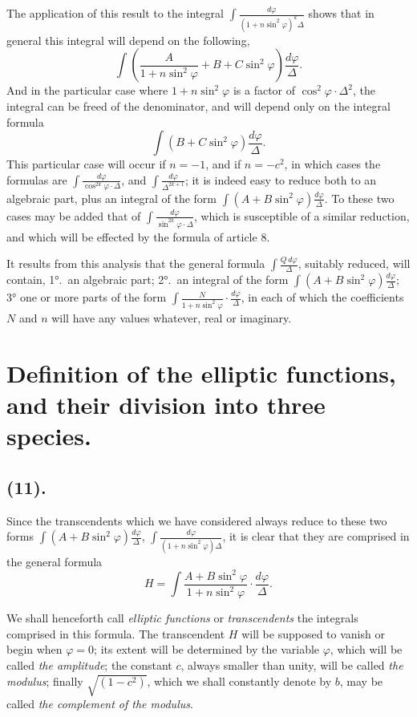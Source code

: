 \documentclass{article}
\begin{document}
The application of this result to the integral $\displaystyle\int\frac{d\varphi}{(1+n\sin^{2}\varphi)^{k}\Delta}$ shows that in general this integral will depend on the following,
\[ \int\left(\frac{A}{1+n\sin^{2}\varphi}+B+C\sin^{2}\varphi\right)\frac{d\varphi}{\Delta}. \]
And in the particular case where $1+n\sin^{2}\varphi$ is a factor of $\cos^{2}\varphi\cdot\Delta^{2}$, the integral can be freed of the denominator, and will depend only on the integral formula
\[ \int(B+C\sin^{2}\varphi)\frac{d\varphi}{\Delta}. \]
This particular case will occur if $n=-1$, and if $n=-c^{2}$, in which cases the formulas are $\displaystyle\int\frac{d\varphi}{\cos^{2k}\varphi\cdot\Delta}$, and $\displaystyle\int\frac{d\varphi}{\Delta^{2k+1}}$; it is indeed easy to reduce both to an algebraic part, plus an integral of the form $\displaystyle\int(A+B\sin^{2}\varphi)\frac{d\varphi}{\Delta}$. To these two cases may be added that of $\displaystyle\int\frac{d\varphi}{\sin^{2k}\varphi\cdot\Delta}$, which is susceptible of a similar reduction, and which will be effected by the formula of article 8.

It results from this analysis that the general formula $\displaystyle\int\frac{Q\,d\varphi}{\Delta}$, suitably reduced, will contain, 1°.\ an algebraic part; 2°.\ an integral of the form $\displaystyle\int(A+B\sin^{2}\varphi)\frac{d\varphi}{\Delta}$; 3° one or more parts of the form $\displaystyle\int\frac{N}{1+n\sin^{2}\varphi}\cdot\frac{d\varphi}{\Delta}$, in each of which the coefficients $N$ and $n$ will have any values whatever, real or imaginary.

\section*{Definition of the elliptic functions, and their division into three species.}

\subsection*{(11).}

Since the transcendents which we have considered always reduce to these two forms $\displaystyle\int(A+B\sin^{2}\varphi)\frac{d\varphi}{\Delta}$, $\displaystyle\int\frac{d\varphi}{(1+n\sin^{2}\varphi)\Delta}$, it is clear that they are comprised in the general formula
\[ H=\int\frac{A+B\sin^{2}\varphi}{1+n\sin^{2}\varphi}\cdot\frac{d\varphi}{\Delta}. \]

We shall henceforth call \emph{elliptic functions} or \emph{transcendents} the integrals comprised in this formula. The transcendent $H$ will be supposed to vanish or begin when $\varphi=0$; its extent will be determined by the variable $\varphi$, which will be called \emph{the amplitude}; the constant $c$, always smaller than unity, will be called \emph{the modulus}; finally $\sqrt{(1-c^{2})}$, which we shall constantly denote by $b$, may be called \emph{the complement of the modulus}.
\end{document}
